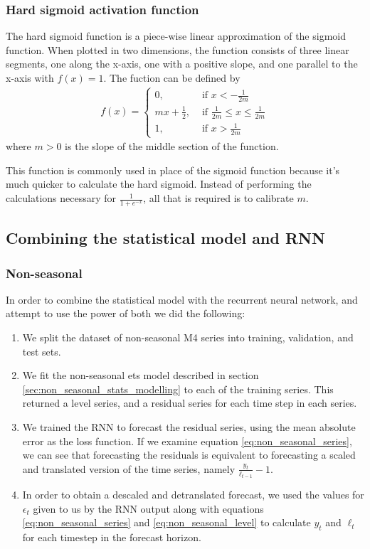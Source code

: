 \documentclass[a4paper,12pt]{article}
\theoremstyle{definition}
\begin{document}
\subsubsection{Hard sigmoid activation function}\label{sec:hard_sigmoid}
The hard sigmoid function is a piece-wise linear approximation of the sigmoid function. When plotted in two dimensions, the function consists of three linear segments, one along the x-axis, one with a positive slope, and one parallel to the x-axis with $f(x) = 1$. The fuction can be defined by 
\begin{align}
	f(x) = \begin{cases}
		0, &\text{ if } x < -\frac{1}{2m} \\
		mx + \frac{1}{2}, &\text{ if }  \frac{1}{2m} \leq x \leq \frac{1}{2m} \\
		1, &\text{ if } x > \frac{1}{2m}
	\end{cases}
\end{align}
where $m>0$ is the slope of the middle section of the function. 

This function is commonly used in place of the sigmoid function because it's much quicker to calculate the hard sigmoid. Instead of performing the calculations necessary for $\frac{1}{1 + e^{-x}}$, all that is required is to calibrate $m$. 

\subsection{Combining the statistical model and RNN}
\subsubsection{Non-seasonal}
In order to combine the statistical model with the recurrent neural network, and attempt to use the power of both we did the following:
\begin{enumerate}
	\item We split the dataset of non-seasonal M4 series into training, validation, and test sets.
	\item We fit the non-seasonal ets model described in section \ref{sec:non_seasonal_stats_modelling} to each of the training series. This returned a level series, and a residual series for each time step in each series. 
	\item We trained the RNN to forecast the residual series, using the mean absolute error as the loss function. If we examine equation \ref{eq:non_seasonal_series}, we can see that forecasting the residuals is equivalent to forecasting a scaled and translated version of the time series, namely $\frac{y_t}{\ell_{t-1}} - 1$.
	\item In order to obtain a descaled and detranslated forecast, we used the values for $\epsilon_t$ given to us by the RNN output along with equations \ref{eq:non_seasonal_series} and \ref{eq:non_seasonal_level} to calculate $y_t$ and $\ell_t$ for each timestep in the forecast horizon.
\end{enumerate}
\end{document}
